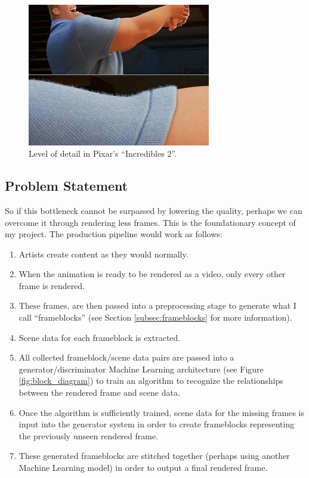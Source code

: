 \documentclass[conference]{IEEEtran}
\begin{document}
\begin{figure}[htbp]
\centerline{\includegraphics[width=8cm]{incredibles.png}}
\caption{Level of detail in Pixar's ``Incredibles 2''.}
\label{fig:incredibles}
\end{figure}

\subsection{Problem Statement}
\label{subsec:problem_statement}
So if this bottleneck cannot be surpassed by lowering the quality, perhaps we
can overcome it through rendering less frames. This is the foundationary concept
of my project. The production pipeline would work as follows:

\begin{enumerate}
\item Artists create content as they would normally.
\item When the animation is ready to be rendered as a video, only every other
frame is rendered.
\item These frames, are then passed into a preprocessing stage to generate
what I call
``frameblocks'' (see Section \ref{subsec:frameblocks} for more information).
\item Scene data for each frameblock is extracted.
\item All collected frameblock/scene data pairs are passed into a generator/discriminator
Machine Learning architecture (see Figure \ref{fig:block_diagram}) to train an algorithm
to recognize the relationships between the rendered frame and scene data.
\item Once the algorithm is sufficiently trained, scene data for the missing
frames is input into the generator system in order to create frameblocks
representing the previously unseen rendered frame.
\item These generated frameblocks are stitched together (perhaps using another Machine
Learning model) in order to output a final rendered frame.
\end{enumerate}
\end{document}
